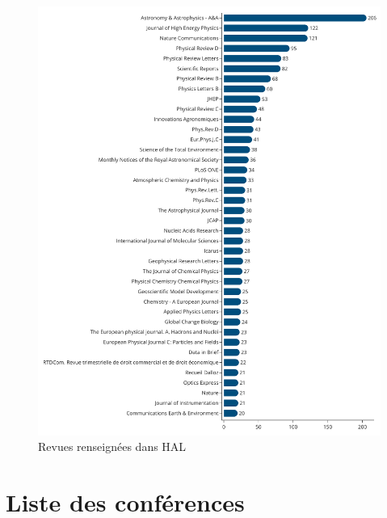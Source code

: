 \documentclass[french, 11pt]{dibiso/biso}
\begin{document}
\begin{figure}[!h]
  \includegraphics[width=\textwidth]{figures/journals_hal.pdf}
  \centering
  \caption{Revues renseignées dans HAL}
  \label{fig_jorunals_hal}
\end{figure}

{\footnotesize\journalshalinfo}








\pagebreak

\section{Liste des conférences}
\end{document}
